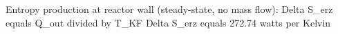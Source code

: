 Entropy production at reactor wall (steady-state, no mass flow):  
Delta S_erz equals Q_out divided by T_KF  
Delta S_erz equals 272.74 watts per Kelvin